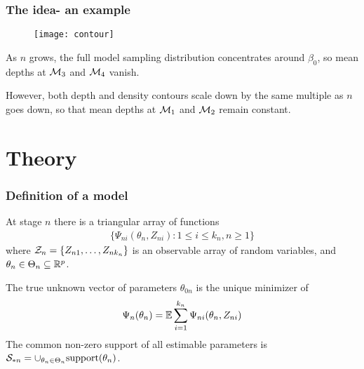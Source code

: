 \documentclass[10pt]{beamer}
\theoremstyle{definition}
\begin{document}

\begin{frame}
\frametitle{The idea- an example}

\begin{figure}
\centering
\texttt{[image: contour]}
\end{figure}

As $n$ grows, the full model sampling distribution concentrates around $\beta_0$, so mean depths at ${\cal{M}}_3$ and ${\cal{M}}_4$ vanish.

However, both depth and density contours scale down by the same multiple as $n$ goes down, so that mean depths at ${\cal{M}}_1$ and ${\cal{M}}_2$ remain constant.

\vspace{3em}
\end{frame}

\section{Theory}
\begin{frame}
\frametitle{Definition of a model}

At stage $n$ there is a triangular array of functions
%
\begin{align*}
\{ \Psi_{ni} (\theta_n, Z_{ni}): 1 \leq i \leq k_n, n \geq 1 \}
\end{align*}
%
where ${\cal{Z}}_n = \{ Z_{n1}, \ldots, Z_{n k_n} \}$ is an observable array of random variables, and $\theta_n \in \Theta_n \subseteq {\mathbb{R}}^{p}$.

The true unknown vector of parameters $\theta_{0 n}$ is the unique minimizer of
%
\begin{align*}
\Psi_n (\theta_n) = {\mathbb{E}} \sum_{i=1}^{k_n} \Psi_{n i} (\theta_n, Z_{n i})
\end{align*}
%
The common non-zero support of all estimable parameters is ${\cal{S}}_{* n} = \cup_{ \theta_n \in \Theta_n} \text{support}(\theta_n)$.

\end{frame}

\end{document}

